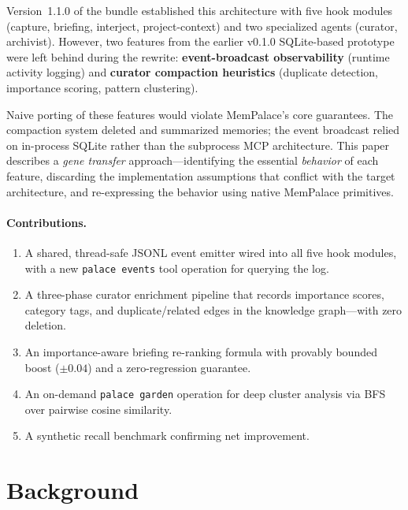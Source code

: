 \documentclass[11pt]{article}
\begin{document}
Version~1.1.0 of the bundle established this architecture with five hook
modules (capture, briefing, interject, project-context) and two
specialized agents (curator, archivist). However, two features from the
earlier v0.1.0 SQLite-based prototype were left behind during the
rewrite: \textbf{event-broadcast observability} (runtime activity
logging) and \textbf{curator compaction heuristics} (duplicate
detection, importance scoring, pattern clustering).

Naive porting of these features would violate MemPalace's core
guarantees. The compaction system deleted and summarized memories; the
event broadcast relied on in-process SQLite rather than the subprocess
MCP architecture. This paper describes a \emph{gene transfer}
approach---identifying the essential \emph{behavior} of each feature,
discarding the implementation assumptions that conflict with the target
architecture, and re-expressing the behavior using native MemPalace
primitives.

\paragraph{Contributions.}
\begin{enumerate}[nosep]
    \item A shared, thread-safe JSONL event emitter wired into all five
          hook modules, with a new \texttt{palace events} tool operation
          for querying the log.
    \item A three-phase curator enrichment pipeline that records
          importance scores, category tags, and duplicate/related edges
          in the knowledge graph---with zero deletion.
    \item An importance-aware briefing re-ranking formula with provably
          bounded boost ($\pm 0.04$) and a zero-regression guarantee.
    \item An on-demand \texttt{palace garden} operation for deep
          cluster analysis via BFS over pairwise cosine similarity.
    \item A synthetic recall benchmark confirming net improvement.
\end{enumerate}

\section{Background}
\end{document}
